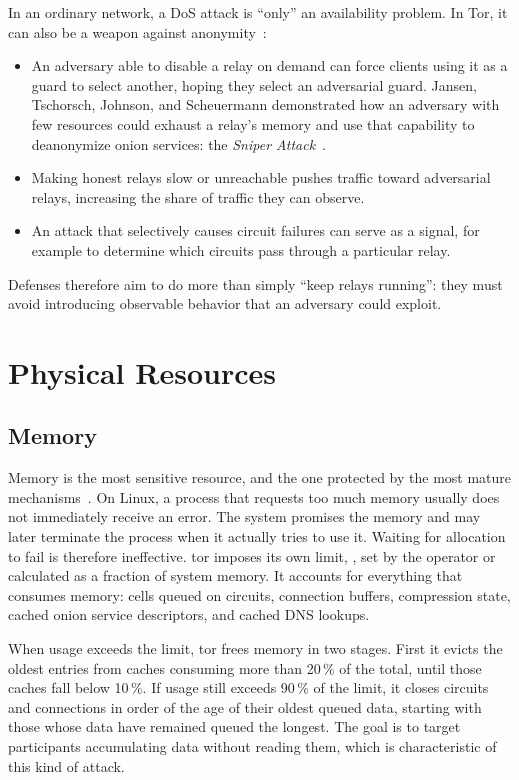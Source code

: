 In an ordinary network, a DoS attack is \enquote{only} an availability problem. In Tor, it can also be a weapon against anonymity~:
\begin{itemize}
  \item An adversary able to disable a relay on demand can force clients using it as a guard to select another, hoping they select an adversarial guard. Jansen, Tschorsch, Johnson, and Scheuermann demonstrated how an adversary with few resources could exhaust a relay's memory and use that capability to deanonymize onion services: the \emph{Sniper Attack}~\cite{jansen2014sniper}.
  \item Making honest relays slow or unreachable pushes traffic toward adversarial relays, increasing the share of traffic they can observe.
  \item An attack that selectively causes circuit failures can serve as a signal, for example to determine which circuits pass through a particular relay.
\end{itemize}
Defenses therefore aim to do more than simply \enquote{keep relays running}: they must avoid introducing observable behavior that an adversary could exploit.

\section{Physical Resources}\label{sec:dos-risorse}

\subsection{Memory}

Memory is the most sensitive resource, and the one protected by the most mature mechanisms~. On Linux, a process that requests too much memory usually does not immediately receive an error. The system promises the memory and may later terminate the process when it actually tries to use it. Waiting for allocation to fail is therefore ineffective. tor imposes its own limit, , set by the operator or calculated as a fraction of system memory. It accounts for everything that consumes memory: cells queued on circuits, connection buffers, compression state, cached onion service descriptors, and cached DNS lookups.

When usage exceeds the limit, tor frees memory in two stages. First it evicts the oldest entries from caches consuming more than 20\,\% of the total, until those caches fall below 10\,\%. If usage still exceeds 90\,\% of the limit, it closes circuits and connections in order of the age of their oldest queued data, starting with those whose data have remained queued the longest. The goal is to target participants accumulating data without reading them, which is characteristic of this kind of attack.

